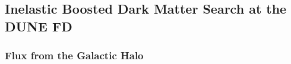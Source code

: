 
\subsection{Inelastic Boosted Dark Matter Search at the DUNE FD 
\label{sec:FD}}

\subsubsection{ Flux from the Galactic Halo \label{sec:flux}}

